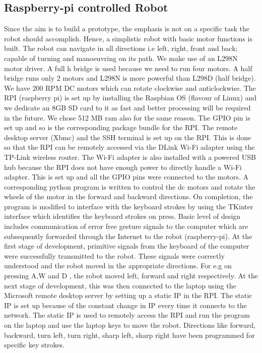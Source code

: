 \subsection{Raspberry-pi controlled Robot}
Since the aim is to build a prototype, the emphasis is not on a specific task the robot should accomplish. Hence, a simplistic robot with basic motor functions is built. The robot can navigate in all directions i.e left, right, front and back; capable of turning and manoeuvring on its path. 
We make use of an L298N motor driver. A full h bridge is used because we need to run four motors. A half bridge runs only 2 motors and L298N is more powerful than L298D (half bridge). We have 200 RPM DC motors which can rotate clockwise and anticlockwise. The RPI (raspberry pi) is set up by installing the Raspbian OS (flavour of Linux) and we dedicate an 8GB SD card to it as fast and better processing will be required in the future. We chose 512 MB ram also for the same reason. The GPIO pin is set up and so is the corresponding package bundle for the RPI. The remote desktop server (Xbmc) and the SSH terminal is set up on the RPI. This is done so that the RPI can be remotely accessed via the DLink Wi-Fi adapter using the TP-Link wireless router. The Wi-Fi adapter is also installed with a powered USB hub because the RPI does not have enough power to directly handle a Wi-Fi adapter. This is set up and all the GPIO pins were connected to the motors. A corresponding python program is written to control the dc motors and rotate the wheels of the motor in the forward and backward directions. 
On completion, the program is modified to interface with the keyboard strokes by using the TKinter interface which identifies the keyboard strokes on press. Basic level of design includes communication of error free gesture signals to the computer which are subsequently forwarded through the Internet to the robot (raspberry-pi). At the first stage of development, primitive signals from the keyboard of the computer were successfully transmitted to the robot. These signals were correctly understood and the robot moved in the appropriate directions. For e.g on pressing A,W and D , the robot moved left, forward and right respectively. 
At the next stage of development, this was then connected to the laptop using the Microsoft remote desktop server by setting up a static IP in the RPI. The static IP is set up because of the constant change in IP every time it connects to the network. The static IP is used to remotely access the RPI and run the program on the laptop and use the laptop keys to move the robot. Directions like forward, backward, turn left, turn right, sharp left, sharp right have been programmed for specific key strokes. 
